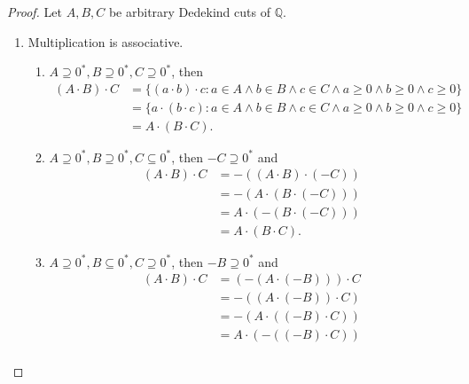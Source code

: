 \begin{proof}
    Let $A, B, C$ be arbitrary Dedekind cuts of $\mathbb{Q}$.
    \begin{enumerate}[label={(F\arabic*)}, start=5]
        \item Multiplication is associative.
              \begin{enumerate}[label={\textbf{Case \arabic*.}},topsep=0pt,itemsep=0pt]
                  \item $A\supseteq {0}^{*}, B\supseteq {0}^{*}, C\supseteq {0}^{*}$, then
                        \begin{align*}
                            (A\cdot B)\cdot C & = \{ (a\cdot b)\cdot c : a\in A\land b\in B\land c\in C\land a\ge 0\land b\ge 0\land c\ge 0 \} \\
                                              & = \{ a\cdot (b\cdot c) : a\in A\land b\in B\land c\in C\land a\ge 0\land b\ge 0\land c\ge 0 \} \\
                                              & = A\cdot (B\cdot C).
                        \end{align*}
                  \item $A\supseteq {0}^{*}, B\supseteq {0}^{*}, C\subseteq {0}^{*}$, then $-C\supseteq {0}^{*}$ and
                        \begin{align*}
                            (A\cdot B)\cdot C & = -\left( (A\cdot B)\cdot (-C) \right)  \\
                                              & = -\left( A\cdot (B \cdot (-C)) \right) \\
                                              & = A\cdot (-(B\cdot (-C)))               \\
                                              & = A\cdot (B\cdot C).
                        \end{align*}
                  \item $A\supseteq {0}^{*}, B\subseteq {0}^{*}, C\supseteq {0}^{*}$, then $-B\supseteq {0}^{*}$ and
                        \begin{align*}
                            (A\cdot B)\cdot C & = (-(A\cdot (-B)))\cdot C \\
                                              & = -((A\cdot (-B))\cdot C) \\
                                              & = -(A\cdot ((-B)\cdot C)) \\
                                              & = A\cdot (-((-B)\cdot C)) \\

\end{align*}
\end{enumerate}
\end{enumerate}
\end{proof}
